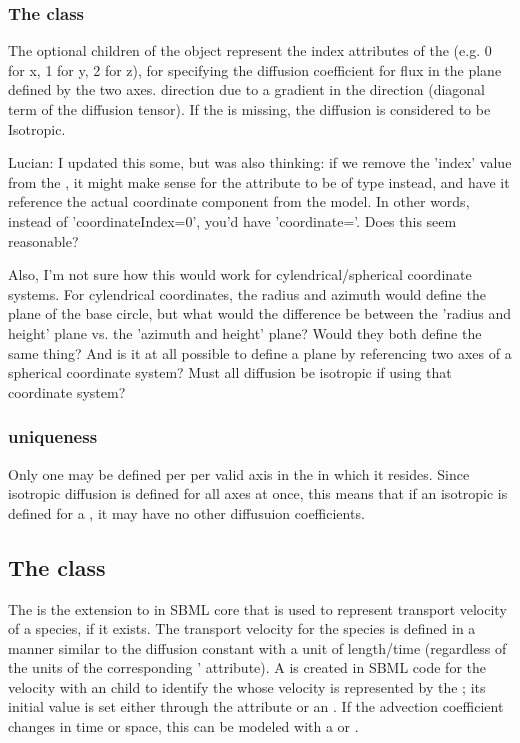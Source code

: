 \subsubsection{The  class}
\label{CoordinateIndex-class}
The optional \CoordinateIndex children of the \DiffusionCoefficient object represent the index attributes of the \CoordinateComponent (e.g. 0 for x, 1 for y, 2 for z), for specifying the diffusion coefficient for flux in the plane defined by the two \CoordinateIndex axes.  
 direction due to a gradient in the  direction (diagonal term of the diffusion tensor).  If the  is missing, the diffusion is considered to be Isotropic.

{\color{red} Lucian: \notice I updated this some, but was also thinking:  if we remove the 'index' value from the \CoordinateComponent, it might make sense for the  attribute to be of type  instead, and have it reference the actual coordinate component from the model.  In other words, instead of 'coordinateIndex=0', you'd have 'coordinate='.  Does this seem reasonable?

Also, I'm not sure how this would work for cylendrical/spherical coordinate systems.  For cylendrical coordinates, the radius and azimuth would define the plane of the base circle, but what would the difference be between the 'radius and height' plane vs. the 'azimuth and height' plane?  Would they both define the same thing?  And is it at all possible to define a plane by referencing two axes of a spherical coordinate system?  Must all diffusion be isotropic if using that coordinate system?}

\subsubsection{\DiffusionCoefficient uniqueness}
Only one \DiffusionCoefficient may be defined per \Species per valid axis in the \Compartment in which it resides.  Since isotropic diffusion is defined for all axes at once, this means that if an isotropic \DiffusionCoefficient is defined for a \Species, it may have no other diffusuion coefficients.


\subsection{The  class}
\label{AdvectionCoefficient-class}
The \AdvectionCoefficient is the extension to \Parameter in SBML core that is used to represent transport velocity of a species, if it exists. The transport velocity for the species is defined in a manner similar to the diffusion constant with a unit of length/time (regardless of the units of the corresponding \Species'  attribute).  A \Parameter is created in SBML code for the velocity with an \AdvectionCoefficient child to identify the \Species whose velocity is represented by the \Parameter; its initial value is set either through the  attribute or an \InitialAssignment.    If the advection coefficient changes in time or space, this can be modeled with a \Rule or \Event.

